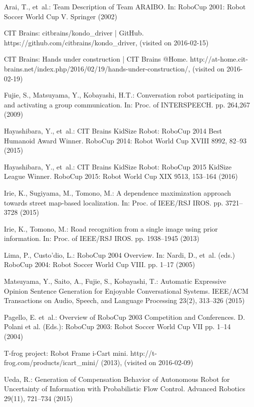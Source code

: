 \documentclass{llncs}
\begin{document}
\begin{thebibliography}{10}
\providecommand{\url}[1]{\texttt{#1}}
\providecommand{\urlprefix}{URL }

Arai, T., et~al.: {Team Description of Team ARAIBO}. In: RoboCup 2001: Robot
  Soccer World Cup V. Springer (2002)

CIT Brains: {citbrains/kondo\_driver | GitHub}.
  {https://github.com/citbrains/kondo\_driver}, (visited on 2016-02-15)

CIT Brains: {Hands under construction | CIT Brains @Home}.
  http://at-home.cit-brains.net/index.php/2016/02/19/hands-under-construction/,
  (visited on 2016-02-19)

Fujie, S., Matsuyama, Y., Kobayashi, H.T.: {Conversation robot participating in
  and activating a group communication}. In: Proc. of INTERSPEECH. pp. 264,267
  (2009)

Hayashibara, Y., et~al.: {CIT Brains KidSize Robot: RoboCup 2014 Best Humanoid
  Award Winner}. RoboCup 2014: Robot World Cup XVIII  8992,  82--93 (2015)

Hayashibara, Y., et~al.: {CIT Brains KidSize Robot: RoboCup 2015 KidSize League
  Winner}. RoboCup 2015: Robot World Cup XIX  9513,  153--164 (2016)

Irie, K., Sugiyama, M., Tomono, M.: {A dependence maximization approach towards
  street map-based localization}. In: Proc. of IEEE/RSJ IROS. pp. 3721--3728
  (2015)

Irie, K., Tomono, M.: {Road recognition from a single image using prior
  information}. In: Proc. of IEEE/RSJ IROS. pp. 1938--1945 (2013)

Lima, P., Custo'dio, L.: {RoboCup 2004 Overview}. In: Nardi, D., et~al. (eds.)
  RoboCup 2004: Robot Soccer World Cup VIII. pp. 1--17 (2005)

Matsuyama, Y., Saito, A., Fujie, S., Kobayashi, T.: {Automatic Expressive
  Opinion Sentence Generation for Enjoyable Conversational Systems}. IEEE/ACM
  Transactions on Audio, Speech, and Language Processing  23(2),  313--326
  (2015)

Pagello, E. et~al.: {Overview of
  RoboCup 2003 Competition and Conferences}. D. Polani et al. (Eds.): RoboCup
  2003: Robot Soccer World Cup VII pp. 1--14 (2004)

{T-frog project}: {Robot Frame i-Cart mini}.
  {http://t-frog.com/products/icart\_mini/} (2013), (visited on 2016-02-09)

Ueda, R.: {Generation of Compensation Behavior of Autonomous Robot for
  Uncertainty of Information with Probabilistic Flow Control}. Advanced
  Robotics  29(11),  721--734 (2015)

\end{thebibliography}
\end{document}
